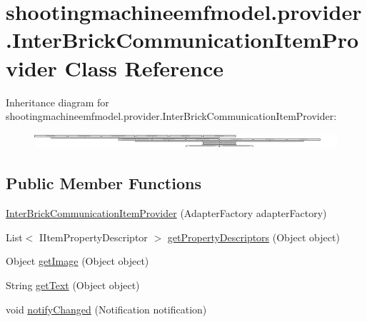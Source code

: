 \hypertarget{classshootingmachineemfmodel_1_1provider_1_1_inter_brick_communication_item_provider}{\section{shootingmachineemfmodel.\-provider.\-Inter\-Brick\-Communication\-Item\-Provider Class Reference}
\label{classshootingmachineemfmodel_1_1provider_1_1_inter_brick_communication_item_provider}
}
Inheritance diagram for shootingmachineemfmodel.\-provider.\-Inter\-Brick\-Communication\-Item\-Provider\-:\begin{figure}[H]
\begin{center}
\leavevmode
\includegraphics[height=0.574801cm]{classshootingmachineemfmodel_1_1provider_1_1_inter_brick_communication_item_provider}
\end{center}
\end{figure}
\subsection*{Public Member Functions}
\begin{DoxyCompactItemize}
\item 
\hyperlink{classshootingmachineemfmodel_1_1provider_1_1_inter_brick_communication_item_provider_a54c87fe4cf406cb18ee74ccd4b583543}{Inter\-Brick\-Communication\-Item\-Provider} (Adapter\-Factory adapter\-Factory)
\item 
List$<$ I\-Item\-Property\-Descriptor $>$ \hyperlink{classshootingmachineemfmodel_1_1provider_1_1_inter_brick_communication_item_provider_ab944c4f61888130234c7b7db8a1dd3b0}{get\-Property\-Descriptors} (Object object)
\item 
Object \hyperlink{classshootingmachineemfmodel_1_1provider_1_1_inter_brick_communication_item_provider_a177be22ca79664cff440ef568e5b8d38}{get\-Image} (Object object)
\item 
String \hyperlink{classshootingmachineemfmodel_1_1provider_1_1_inter_brick_communication_item_provider_a5670ccf2d577174322ebead081059eb2}{get\-Text} (Object object)
\item 
void \hyperlink{classshootingmachineemfmodel_1_1provider_1_1_inter_brick_communication_item_provider_a1f0fd44dc24c569083f0ab6d26972c76}{notify\-Changed} (Notification notification)
\end{DoxyCompactItemize}
